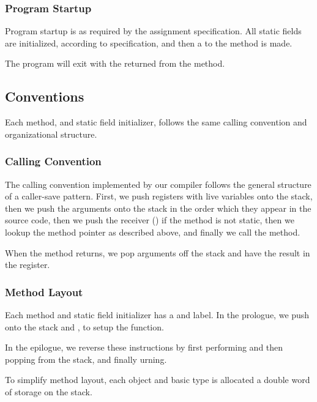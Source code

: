 \documentclass[pdftex,11pt,a4paper]{article}
\begin{document}
\subsubsection{Program Startup}

Program startup is as required by the assignment specification. All
static fields are initialized, according to specification, and then a
 to the  method is made.

The program will exit with the  returned from the
 method.

\subsection{Conventions}

Each method, and static field initializer, follows the same calling
convention and organizational structure.

\subsubsection{Calling Convention}

The calling convention implemented by our compiler follows the general
structure of a caller-save pattern. First, we push registers with live
variables onto the stack, then we push the arguments onto the stack in
the order which they appear in the source code, then we push the
receiver () if the method is not static, then we lookup the
method pointer as described above, and finally we call the method.

When the method returns, we pop arguments off the stack and have the
result in the  register.

\subsubsection{Method Layout}

Each method and static field initializer has a  and
 label. In the prologue, we push  onto the
stack and , to setup the function.

In the epilogue, we reverse these instructions by first performing
 and then popping  from the stack, and
finally urning.

To simplify method layout, each object and basic type is allocated a
double word of storage on the stack.
\end{document}
